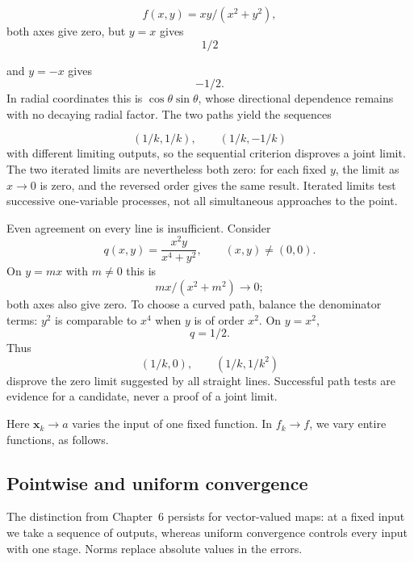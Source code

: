 \[
f(x,y)=xy/(x^2+y^2),
\]
 both axes give zero, but $y=x$ gives
\[
1/2
\]

and $y=-x$ gives
\[
-1/2.
\]
 In radial coordinates this is
$\cos\theta\sin\theta$, whose directional dependence remains with no
decaying radial factor. The two paths yield the sequences

\[
(1/k,1/k),\qquad (1/k,-1/k)
\]
 with different limiting outputs, so the
sequential criterion disproves a joint limit.
The two iterated limits are nevertheless both zero: for each fixed $y$,
the limit as $x\to0$ is zero, and the reversed order gives the same result.
Iterated limits test successive one-variable processes, not all simultaneous
approaches to the point.

Even agreement on every line is insufficient. Consider
\[
q(x,y)=\frac{x^2y}{x^4+y^2},\qquad (x,y)\ne(0,0).
\]
On $y=mx$ with $m\ne0$ this is
\[
mx/(x^2+m^2)\to0;
\]
 both axes also
give zero. To choose a curved path, balance the denominator terms:
$y^2$ is comparable to $x^4$ when $y$ is of order $x^2$.
On $y=x^2$,
\[
q=1/2.
\]
 Thus
\[
(1/k,0),\qquad (1/k,1/k^2)
\]
 disprove
the zero limit suggested by all straight lines. Successful path tests
are evidence for a candidate, never a proof of a joint limit.

\begin{center}\end{center}
Here $\mathbf{x}_k\to a$ varies the input of one fixed function. In $f_k\to f$,
we vary entire functions, as follows.

\subsection{Pointwise and uniform convergence}

The distinction from Chapter~6 persists for vector-valued maps: at a fixed
input we take a sequence of outputs, whereas uniform convergence controls
every input with one stage. Norms replace absolute values in the errors.

